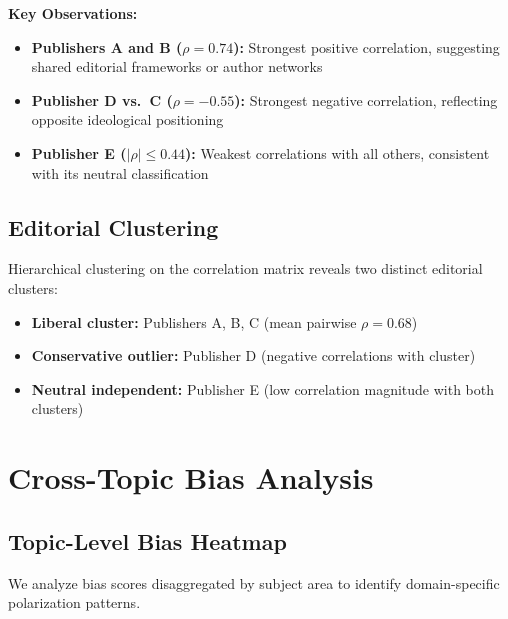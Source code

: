 \documentclass[11pt,a4paper]{article}
\begin{document}
\textbf{Key Observations:}
\begin{itemize}
    \item \textbf{Publishers A and B ($\rho = 0.74$):} Strongest positive correlation, suggesting shared editorial frameworks or author networks
    \item \textbf{Publisher D vs.\ C ($\rho = -0.55$):} Strongest negative correlation, reflecting opposite ideological positioning
    \item \textbf{Publisher E ($|\rho| \leq 0.44$):} Weakest correlations with all others, consistent with its neutral classification
\end{itemize}

\subsection{Editorial Clustering}

Hierarchical clustering on the correlation matrix reveals two distinct editorial clusters:
\begin{itemize}
    \item \textbf{Liberal cluster:} Publishers A, B, C (mean pairwise $\rho = 0.68$)
    \item \textbf{Conservative outlier:} Publisher D (negative correlations with cluster)
    \item \textbf{Neutral independent:} Publisher E (low correlation magnitude with both clusters)
\end{itemize}

\section{Cross-Topic Bias Analysis}

\subsection{Topic-Level Bias Heatmap}

We analyze bias scores disaggregated by subject area to identify domain-specific polarization patterns.
\end{document}
